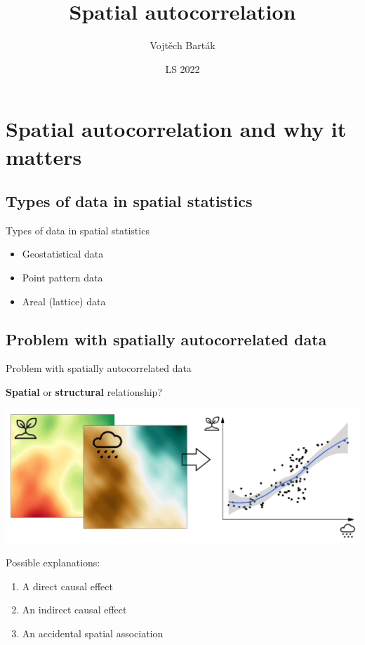 \documentclass[
  ignorenonframetext,
]{beamer}
\title{Spatial autocorrelation}
\author{Vojtěch Barták}
\date{LS 2022}
\providecommand{\tightlist}{%
  \setlength{\itemsep}{0pt}\setlength{\parskip}{0pt}}
\begin{document}
\frame{\titlepage}

\begin{frame}[allowframebreaks]
  \tableofcontents[hideallsubsections]
\end{frame}
\hypertarget{spatial-autocorrelation-and-why-it-matters}{%
\section{Spatial autocorrelation and why it
matters}\label{spatial-autocorrelation-and-why-it-matters}}

\hypertarget{types-of-data-in-spatial-statistics}{%
\subsection{Types of data in spatial
statistics}\label{types-of-data-in-spatial-statistics}}

\begin{frame}{Types of data in spatial statistics}
\begin{itemize}
\tightlist
\item
  Geostatistical data
\item
  Point pattern data
\item
  Areal (lattice) data
\end{itemize}
\end{frame}

\hypertarget{problem-with-spatially-autocorrelated-data}{%
\subsection{Problem with spatially autocorrelated
data}\label{problem-with-spatially-autocorrelated-data}}

\begin{frame}{Problem with spatially autocorrelated data}
\small

\textbf{Spatial} or \textbf{structural} relationship?

\includegraphics{species.png}

Possible explanations:

\begin{enumerate}
\tightlist
\item
  A direct causal effect
\item
  An indirect causal effect
\item
  An accidental spatial association
\end{enumerate}
\end{frame}
\end{document}
